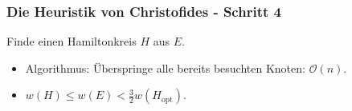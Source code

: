 \begin{frame}
    \frametitle{Die Heuristik von Christofides - Schritt 4}
    Finde einen Hamiltonkreis $H$ aus $E$.
    \begin{itemize}
        \item Algorithmus: Überspringe alle bereits besuchten Knoten: $\mathcal{O}(n)$.
        \item $w(H) \leq w(E) < \frac{3}{2} w(H_{\mathrm{opt}})$.
    \end{itemize}
\end{frame}
